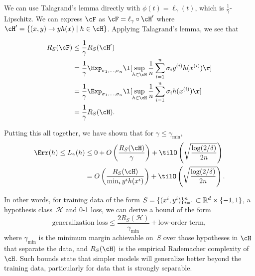 We can use Talagrand's lemma directly with $\phi(t) = \ell_\gamma(t)$, which is $\frac{1}{\gamma}$-Lipschitz. We can express $\cF$ as $\cF=\ell_\gamma\circ\cH'$ where $\cH' = \{(x,y)\to yh(x)\mid h\in\cH\}$. Applying Talagrand's lemma, we see that

\begin{align}
R_S(\cF) &\leq \frac{1}{\gamma}R_S(\cH') \\
&= \frac{1}{\gamma}\Exp_{\sigma_1,\dots, \sigma_n} \l[ \sup_{h\in \cH} \frac{1}{n} \sum^n_{i=1} \sigma_i y^{(i)}h(x^{(i)}) \r] \\
&= \frac{1}{\gamma}\Exp_{\sigma_1,\dots, \sigma_n} \l[ \sup_{h\in \cH} \frac{1}{n} \sum^n_{i=1} \sigma_i h(x^{(i)})  \r] \\
&= \frac{1}{\gamma}R_S(\cH).
\end{align}

Putting this all together, we have shown that for $\gamma \leq \gamma_{\min}$,
\begin{align}
\Err(h) \leq L_\gamma(h) &\leq 0 + O \left( \frac{R_S(\cH)}{\gamma} \right) + \tilO \left( \sqrt{\frac{\log (2 / \delta)}{2n}} \right) \\
&= O \left( \frac{R_S(\cH)}{\min_i y\sp{i} h(x\sp{i}) } \right) + \tilO \left( \sqrt{\frac{\log (2 / \delta)}{2n}} \right).
\end{align}

In other words, for training data of the form $S = \{(x\sp{i},y\sp{i})\}_{i=1}^n \subset \mathbb{R}^d \times \{-1,1\}$, a hypothesis class~$\mathcal{H}$ and 0-1 loss, we can derive a bound of the form
\begin{equation}\label{lec7:eqn:generalization_loss}
    \text{generalization loss} \leq \frac{2R_S(\mathcal{H})}{\gamma_{\mathrm{min}}} + \text{low-order term},
\end{equation}
where $\gamma_\mathrm{min}$ is the minimum margin achievable on~$S$ over those hypotheses in $\cH$ that separate the data, and $R_S(\cH)$ is the empirical Rademacher complexity of $\cH$. Such bounds state that simpler models will generalize better beyond the training data, particularly for data that is strongly separable.

